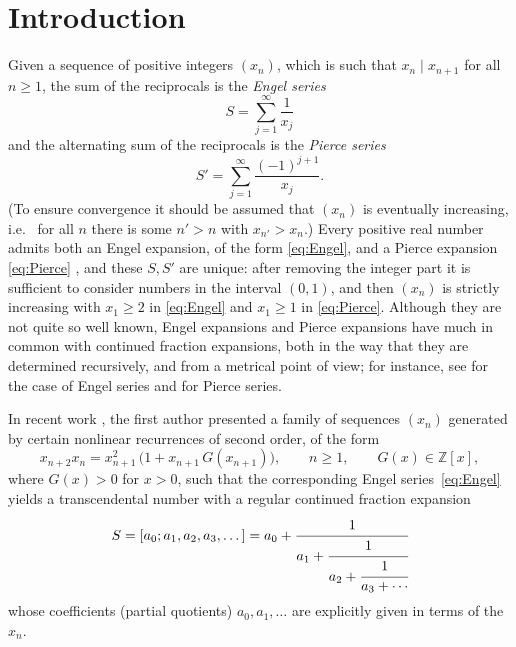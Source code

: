 \documentclass[12pt,a4paper]{amsart}
\theoremstyle{definition}
\numberwithin{equation}{section}
\newcommand{\Z}{\mathbb{Z}}
\begin{document}

\maketitle 


\section{Introduction} %
\label{sec:intro}


Given a sequence of positive integers $(x_n)$, which is such that $x_n \mid x_{n+1}$ 
 for all $n\geq1$, the sum of the reciprocals is the \textit{Engel series}
\begin{equation}
\label{eq:Engel}
 S = \sum_{j=1}^{\infty} \frac{1}{x_j}
\end{equation}
and the alternating sum of the reciprocals is the \textit{Pierce series}~\cite{pierce}
\begin{equation}
\label{eq:Pierce}
  S' = \sum_{j=1}^{\infty} \frac{(-1)^{j+1}}{x_j}.
\end{equation}
(To ensure convergence it should be assumed that $(x_n)$ is eventually increasing, i.e.\ 
for all $n$ there is some $n'>n$ with $x_{n'}>x_n$.) 
Every positive real number admits both an Engel expansion, of the 
form \eqref{eq:Engel}, and a Pierce expansion \eqref{eq:Pierce} \cite{duverney, erdosshallit}, 
and these $S,S'$ are unique: 
after removing the integer part it is sufficient to consider numbers in the interval $(0,1)$, 
and then $(x_n)$ is strictly increasing with $x_1\geq 2$ 
in \eqref{eq:Engel} and $x_1\geq 1$ in \eqref{eq:Pierce}. Although they are not quite so well 
known, Engel expansions and Pierce expansions have much in common with 
continued fraction expansions, both in the way that they are determined recursively, and from a 
metrical point of view; for instance, see \cite{erdosetal} for the case of Engel series and \cite{shallitPierce} for Pierce series. 

In recent work \cite{Hone1}, 
the first author presented a family of sequences $(x_n)$ generated by certain nonlinear recurrences of second order, of the form 
\begin{equation}
\label{2nd} 
x_{n+2}x_{n} = x_{n+1}^2 \,\big(1+x_{n+1}\,G(x_{n+1})\big), \qquad n\geq 1, \qquad G(x)\in \Z [x], 
\end{equation} 
where $G(x)>0$ for $x>0$, %
such 
that the corresponding Engel series~\eqref{eq:Engel} yields a transcendental number 
with a regular 
continued fraction expansion 
\[ 
S = 
  [a_0;a_1,a_2,a_3, \dots] = a_0 + \cfrac{1}{ a_1 + \cfrac{1}{ a_2 + \cfrac{1}{ a_3+ \cdots } } }
\]
whose coefficients (partial quotients) $a_0,a_1,\ldots$ 
are explicitly given in terms of the~$x_n$. 
\end{document}
